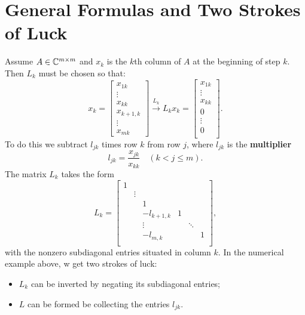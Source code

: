 \section{General Formulas and Two Strokes of Luck}
Assume $A\in \mathbb{C}^{m\times m}$ and $x_k$ is the $k$th column of $A$ at the beginning of step $k$. Then $L_k$ must be chosen so that: 
\[
    x_k = \begin{bmatrix}
         x_{1k} \\
         \vdots \\
         x_{kk} \\
         x_{k+1, k} \\
         \vdots \\
         x_{mk}
    \end{bmatrix}
    \stackrel{L_k }{\longrightarrow} L_k x_k = \begin{bmatrix}
         x_{1k} \\
         \vdots \\
         x_{kk} \\
         0 \\
         \vdots \\
         0 \\
    \end{bmatrix}.   
\]
To do this we subtract $l_{jk}$ times row $k$ from row $j$, where $l_{jk}$ is the \textbf{multiplier}
\[
    l_{jk} = \frac{x_{jk}}{x_{kk}} \quad (k<j\le m). 
\]
The matrix $L_k$ takes the form 
\[
    L_k = \begin{bmatrix}
        1 &  &  &  &  &   \\
         & \vdots &  &  &  &   \\
         &  & 1 &  &  &   \\
         &  & -l_{k+1,k} & 1 &  &   \\
         &  & \vdots &  & \ddots &   \\
         &  & -l_{m,k} &  &  &  1 \\
    \end{bmatrix},  
\]
with the nonzero subdiagonal entries situated in column $k$. In the numerical example above, w get two strokes of luck: 
\begin{itemize}
    \item $L_k$ can be inverted by negating its subdiagonal entries; 
    \item $L$ can be formed be collecting the entries $l_{jk}$. 
\end{itemize}

